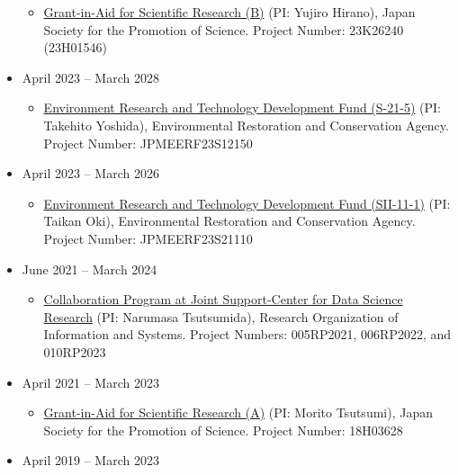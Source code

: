 \documentclass[
]{book}
\providecommand{\tightlist}{%
  \setlength{\itemsep}{0pt}\setlength{\parskip}{0pt}}
\begin{document}
\begin{itemize}
  \begin{itemize}
  \tightlist
  \item
    \href{https://kaken.nii.ac.jp/en/grant/KAKENHI-PROJECT-23K26240/}{Grant-in-Aid for Scientific Research (B)} (PI: Yujiro Hirano),
    Japan Society for the Promotion of Science.
    Project Number: 23K26240 (23H01546)
  \end{itemize}
\item
  April 2023 -- March 2028

  \begin{itemize}
  \tightlist
  \item
    \href{https://www.erca.go.jp/suishinhi/index.html}{Environment Research and Technology Development Fund (S-21-5)} (PI: Takehito Yoshida),
    Environmental Restoration and Conservation Agency.
    Project Number: JPMEERF23S12150
  \end{itemize}
\item
  April 2023 -- March 2026

  \begin{itemize}
  \tightlist
  \item
    \href{https://www.erca.go.jp/suishinhi/index.html}{Environment Research and Technology Development Fund (SII-11-1)} (PI: Taikan Oki),
    Environmental Restoration and Conservation Agency.
    Project Number: JPMEERF23S21110
  \end{itemize}
\item
  June 2021 -- March 2024

  \begin{itemize}
  \tightlist
  \item
    \href{https://ds.rois.ac.jp/en_crp/en_calling/}{Collaboration Program at Joint Support-Center for Data Science Research} (PI: Narumasa Tsutsumida),
    Research Organization of Information and Systems.
    Project Numbers: 005RP2021, 006RP2022, and 010RP2023
  \end{itemize}
\item
  April 2021 -- March 2023

  \begin{itemize}
  \tightlist
  \item
    \href{https://kaken.nii.ac.jp/en/grant/KAKENHI-PROJECT-18H03628/}{Grant-in-Aid for Scientific Research (A)} (PI: Morito Tsutsumi),
    Japan Society for the Promotion of Science.
    Project Number: 18H03628
  \end{itemize}
\item
  April 2019 -- March 2023


\end{itemize}
\end{document}

